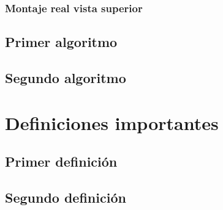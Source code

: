 \documentclass[12]{article}
\newenvironment{Figure}
{\par\medskip\noindent\minipage{\linewidth}}
{\endminipage\par\medskip}
\begin{document}
\subsection{Montaje real vista superior}
\begin{Figure}	
\center
{}
\label{fig:G}
\end{Figure}



\section{Primer algoritmo}
\section{Segundo algoritmo}
\chapter{Definiciones importantes}
\section{Primer definición}
\section{Segundo definición}
\end{document}
